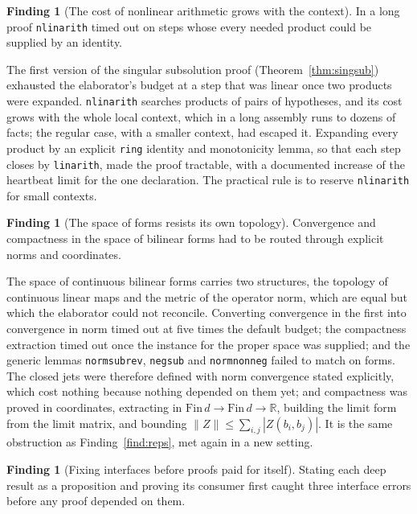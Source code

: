 \documentclass[11pt,reqno]{amsart}
\newcommand{\LEANREF}[1]{\texttt{\small\def\_{\textunderscore\allowbreak}#1}}
\newcommand{\R}{\mathbb{R}}
\theoremstyle{plain}
\theoremstyle{definition}
\newtheorem{finding}[theorem]{Finding}
\begin{document}
\begin{finding}[The cost of nonlinear arithmetic grows with the
context]\label{find:nlin}
In a long proof \LEANREF{nlinarith} timed out on steps whose every needed
product could be supplied by an identity.
\end{finding}

The first version of the singular subsolution proof (Theorem~\ref{thm:singsub})
exhausted the elaborator's budget at a step that was linear once two products
were expanded. \LEANREF{nlinarith} searches products of pairs of hypotheses, and
its cost grows with the whole local context, which in a long assembly runs to
dozens of facts; the regular case, with a smaller context, had escaped it.
Expanding every product by an explicit \LEANREF{ring} identity and
monotonicity lemma, so that each step closes by \LEANREF{linarith}, made the
proof tractable, with a documented increase of the heartbeat limit for the one
declaration. The practical rule is to reserve \LEANREF{nlinarith} for small
contexts.


\begin{finding}[The space of forms resists its own
topology]\label{find:bilin}
Convergence and compactness in the space of bilinear forms had to be routed
through explicit norms and coordinates.
\end{finding}

The space of continuous bilinear forms carries two structures, the topology of
continuous linear maps and the metric of the operator norm, which are equal but
which the elaborator could not reconcile. Converting convergence in the first
into convergence in norm timed out at five times the default budget; the
compactness extraction timed out once the instance for the proper space was
supplied; and the generic lemmas \LEANREF{norm\_sub\_rev},
\LEANREF{neg\_sub} and \LEANREF{norm\_nonneg} failed to match on forms. The
closed jets were therefore defined with norm convergence stated explicitly,
which cost nothing because nothing depended on them yet; and compactness was
proved in coordinates, extracting in $\mathrm{Fin}\,d \to \mathrm{Fin}\,d \to
\R$, building the limit form from the limit matrix, and bounding
$\|Z\| \le \sum_{i,j} |Z(b_i, b_j)|$. It is the same obstruction as
Finding~\ref{find:reps}, met again in a new setting.

\begin{finding}[Fixing interfaces before proofs paid for
itself]\label{find:junctions}
Stating each deep result as a proposition and proving its consumer first caught
three interface errors before any proof depended on them.
\end{finding}
\end{document}
